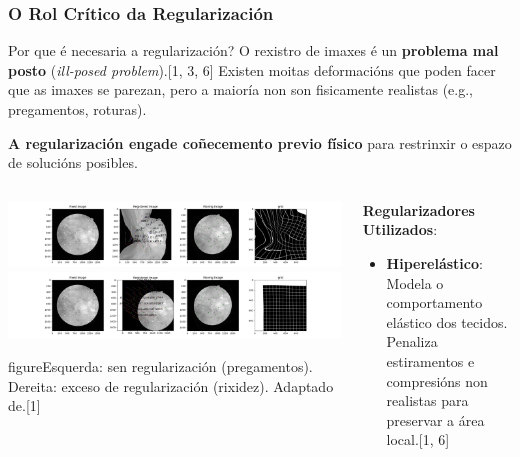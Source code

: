 \documentclass[xcolor=dvipsnames]{beamer}
\begin{document}
\begin{frame}
    \frametitle{O Rol Crítico da Regularización}
    
    \begin{block}{Por que é necesaria a regularización?}
        O rexistro de imaxes é un \textbf{problema mal posto} (\textit{ill-posed problem}).[1, 3, 6] Existen moitas deformacións que poden facer que as imaxes se parezan, pero a maioría non son fisicamente realistas (e.g., pregamentos, roturas).
        \vspace{0.2cm}
        
        \textbf{A regularización engade coñecemento previo físico} para restrinxir o espazo de solucións posibles.
    \end{block}
    
    \begin{columns}
        \begin{column}{0.5\textwidth}
            \centering
                \includegraphics[width=\textwidth]{../imaxes/reg_examples/no_reg_example.png}
                \includegraphics[width=\textwidth]{../imaxes/reg_examples/too_much_reg_example.png}
    
        \small{figure}{Esquerda: sen regularización (pregamentos). Dereita: exceso de regularización (rixidez). Adaptado de.[1]}
        \end{column}


        
        \begin{column}{0.5\textwidth}
            \textbf{Regularizadores Utilizados}:
            \begin{itemize}
                \item \textbf{Hiperelástico}: Modela o comportamento elástico dos tecidos. Penaliza estiramentos e compresións non realistas para preservar a área local.[1, 6]
                
                \vspace{0.3cm}
                

\end{itemize}
\end{column}
\end{columns}
\end{frame}
\end{document}
